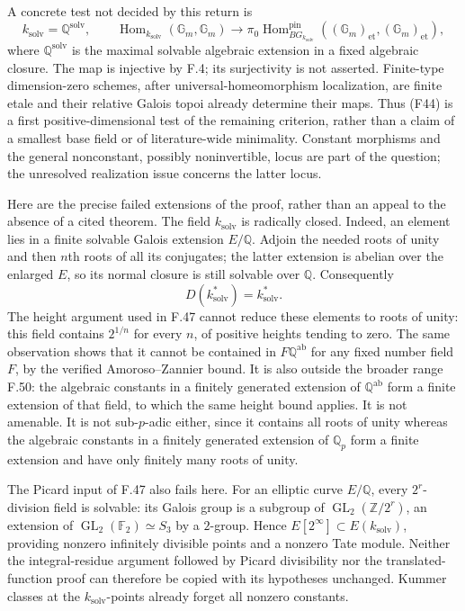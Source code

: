 A concrete test not decided by this return is
\[
 k_{\mathrm{solv}}=\mathbb Q^{\mathrm{solv}},\qquad
 \operatorname{Hom}_{k_{\mathrm{solv}}}(\mathbb G_m,\mathbb G_m)
 \longrightarrow
 \pi_0\operatorname{Hom}^{\mathrm{pin}}_{B G_{k_{\mathrm{solv}}}}
       ((\mathbb G_m)_{\mathrm{et}},(\mathbb G_m)_{\mathrm{et}}),
 \tag{F44}
\]
where $\mathbb Q^{\mathrm{solv}}$ is the maximal solvable algebraic
extension in a fixed algebraic closure. The map is injective by
F.4; its surjectivity is not asserted. Finite-type dimension-zero
schemes, after universal-homeomorphism localization, are finite
etale and their relative Galois topoi already determine their maps.
Thus (F44) is a first positive-dimensional test of the remaining
criterion, rather than a claim of a smallest base field or of
literature-wide minimality. Constant morphisms and the general
nonconstant, possibly noninvertible, locus are part of the question;
the unresolved realization issue concerns the latter locus.

Here are the precise failed extensions of the proof, rather than
an appeal to the absence of a cited theorem. The field
$k_{\mathrm{solv}}$ is radically closed. Indeed, an element lies
in a finite solvable Galois extension $E/\mathbb Q$. Adjoin the
needed roots of unity and then $n$th roots of all its conjugates;
the latter extension is abelian over the enlarged $E$, so its
normal closure is still solvable over $\mathbb Q$. Consequently
\[
       D(k_{\mathrm{solv}}^*)=k_{\mathrm{solv}}^*.
\]
The height argument used in F.47 cannot reduce these elements to
roots of unity: this field contains $2^{1/n}$ for every $n$, of
positive heights tending to zero. The same observation shows that
it cannot be contained in $F\mathbb Q^{\mathrm{ab}}$ for any
fixed number field $F$, by the verified Amoroso--Zannier bound.
It is also outside the broader range F.50: the algebraic constants
in a finitely generated extension of $\mathbb Q^{\mathrm{ab}}$
form a finite extension of that field, to which the same height
bound applies.
It is not amenable. It is not sub-$p$-adic either, since it contains
all roots of unity whereas the algebraic constants in a finitely
generated extension of $\mathbb Q_p$ form a finite extension and
have only finitely many roots of unity.

The Picard input of F.47 also fails here. For an elliptic curve
$E/\mathbb Q$, every $2^r$-division field is solvable: its Galois
group is a subgroup of
$\operatorname{GL}_2(\mathbb Z/2^r)$, an extension of
$\operatorname{GL}_2(\mathbb F_2)\simeq S_3$ by a $2$-group.
Hence $E[2^\infty]\subset E(k_{\mathrm{solv}})$, providing
nonzero infinitely divisible points and a nonzero Tate module.
Neither the integral-residue argument followed by Picard
divisibility nor the translated-function proof can therefore be
copied with its hypotheses unchanged. Kummer classes at the
$k_{\mathrm{solv}}$-points already forget all nonzero constants.


